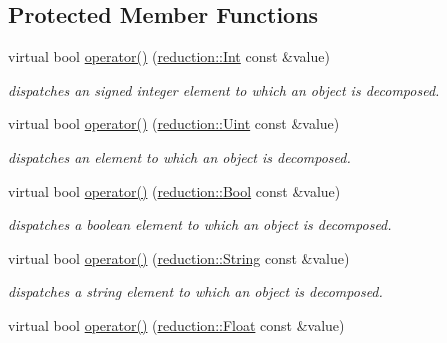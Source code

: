 \subsection*{Protected Member Functions}
\begin{DoxyCompactItemize}
\item 
virtual bool \hyperlink{classhryky_1_1reduction_1_1_stream_af94ad7305cc5e232aff63689f98f5b98}{operator()} (\hyperlink{classhryky_1_1reduction_1_1_int}{reduction\-::\-Int} const \&value)
\begin{DoxyCompactList}\small\item\em dispatches an signed integer element to which an object is decomposed. \end{DoxyCompactList}\item 
virtual bool \hyperlink{classhryky_1_1reduction_1_1_stream_a85c5361f5dd26d12703bcaaf49d70669}{operator()} (\hyperlink{classhryky_1_1reduction_1_1_uint}{reduction\-::\-Uint} const \&value)
\begin{DoxyCompactList}\small\item\em dispatches an element to which an object is decomposed. \end{DoxyCompactList}\item 
\hypertarget{classhryky_1_1reduction_1_1_stream_af34bc9677442da4751a758af377b2a66}{virtual bool \hyperlink{classhryky_1_1reduction_1_1_stream_af34bc9677442da4751a758af377b2a66}{operator()} (\hyperlink{classhryky_1_1reduction_1_1_bool}{reduction\-::\-Bool} const \&value)}\label{classhryky_1_1reduction_1_1_stream_af34bc9677442da4751a758af377b2a66}

\begin{DoxyCompactList}\small\item\em dispatches a boolean element to which an object is decomposed. \end{DoxyCompactList}\item 
\hypertarget{classhryky_1_1reduction_1_1_stream_a38aa345324ef7f0e1c0aab7bb38915b1}{virtual bool \hyperlink{classhryky_1_1reduction_1_1_stream_a38aa345324ef7f0e1c0aab7bb38915b1}{operator()} (\hyperlink{classhryky_1_1reduction_1_1_string}{reduction\-::\-String} const \&value)}\label{classhryky_1_1reduction_1_1_stream_a38aa345324ef7f0e1c0aab7bb38915b1}

\begin{DoxyCompactList}\small\item\em dispatches a string element to which an object is decomposed. \end{DoxyCompactList}\item 
\hypertarget{classhryky_1_1reduction_1_1_stream_ae44e119022d635cd54049729e29ba770}{virtual bool \hyperlink{classhryky_1_1reduction_1_1_stream_ae44e119022d635cd54049729e29ba770}{operator()} (\hyperlink{classhryky_1_1reduction_1_1_float}{reduction\-::\-Float} const \&value)}\label{classhryky_1_1reduction_1_1_stream_ae44e119022d635cd54049729e29ba770}


\end{DoxyCompactItemize}
